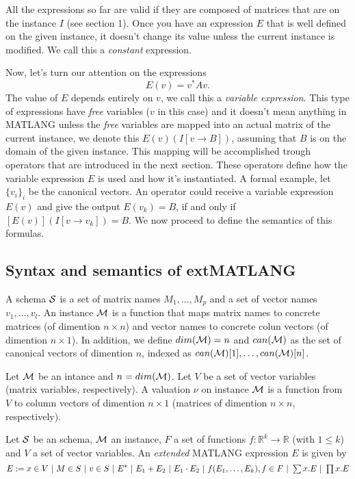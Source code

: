 All the expressions so far are valid if they are composed of matrices that are on the instance $I$ (see section 1). Once you have an expression $E$ that is well defined on the given instance, it doesn't change its value unless the current instance is modified. We call this a \textit{constant} expression.

Now, let's turn our attention on the expressions $$E(v)=v^* Av.$$ The value of $E$ depends entirely on $v$, we call this a \textit{variable expression}. This type of expressions have \textit{free} variables ($v$ in this case) and it doesn't mean anything in MATLANG unless the \textit{free} variables are mapped into an actual matrix of the current instance, we denote this $E(v)(I[v\rightarrow B])$, assuming that $B$ is on the domain of the given instance. This mapping will be accomplished trough operators that are introduced in the next section. These operators define how the variable expression $E$ is used and how it's instantiated.
A formal example, let $\lbrace v_i\rbrace_i$ be the canonical vectors. An operator could receive a variable expression $E(v)$ and give the output $E(v_k)=B$, if and only if $[E(v)](I[v\rightarrow v_k])=B$.
We now proceed to define the semantics of this formulas.

\subsection{Syntax and semantics of  extMATLANG}

A schema $\mathcal{S}$ is a set of matrix names $M_1,\ldots, M_p$ and a set of vector names $v_1,\ldots, v_l$.
An instance $\mathcal{M}$ is a function that maps matrix names to concrete matrices (of dimention $n\times n$) and vector names to concrete colun vectors (of dimention $n\times 1$). 
In addition, we define $dim(\mathcal{M})=n$ and $can(\mathcal{M})$ as the set of canonical vectors of dimention $n$, indexed as $can(\mathcal{M})[1], \ldots,can(\mathcal{M})[n]$.

Let $\mathcal{M}$ be an intance and $n=dim(\mathcal{M})$. Let $V$ be a set of vector variables (matrix variables, respectively). A valuation $\nu$ on instance $\mathcal{M}$ is a function from $V$ to column vectors of dimention $n\times 1$ (matrices of dimention $n\times n$, respectively). 

Let $\mathcal{S}$ be an schema, $\mathcal{M}$ an instance, $F$ a set of functions $f:\mathbb{R}^{k}\rightarrow\mathbb{R}$ (with $1\leq k$) and $V$ a set of vector variables. An \textit{extended} MATLANG expression $E$ is given by
$$
E:= x\in V \ |\  M\in S \ |\  v\in S \ |\  E^* \ |\ E_1+E_2 \ |\  E_1\cdot E_2 \ |\  f(E_1,\ldots, E_k), f\in F \ |\  \ssum x. E \ |\  \sprod x. E
$$

